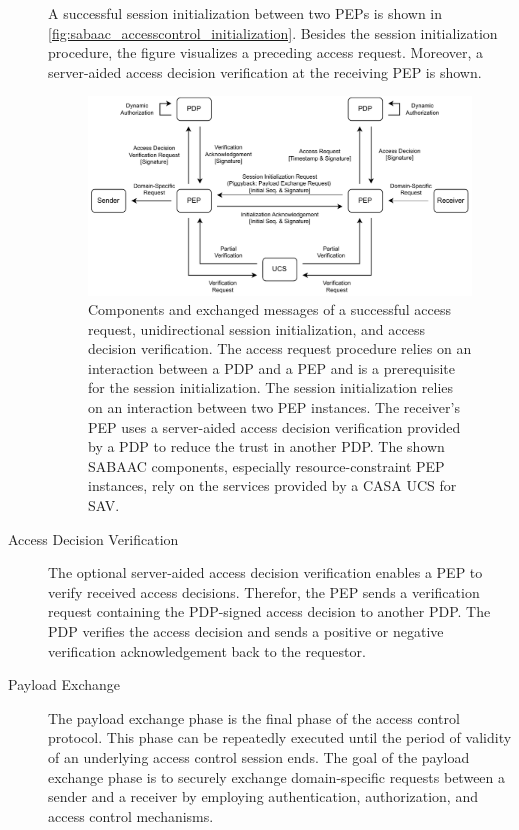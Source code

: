 \begin{description}
    A successful session initialization between two PEPs is shown in \autoref{fig:sabaac_accesscontrol_initialization}.
    Besides the session initialization procedure, the figure visualizes a preceding access request.
    Moreover, a server-aided access decision verification at the receiving PEP is shown.
    \begin{figure}
        \centering
        \includegraphics[width=1.0\linewidth]{figures/SABAAC_protocols_accesscontrol_initialization.drawio.pdf}
        \caption{Components and exchanged messages of a successful access request, unidirectional session initialization, and access decision verification. The access request procedure relies on an interaction between a PDP and a PEP and is a prerequisite for the session initialization. The session initialization relies on an interaction between two PEP instances. The receiver's PEP uses a server-aided access decision verification provided by a PDP to reduce the trust in another PDP. The shown SABAAC components, especially resource-constraint PEP instances, rely on the services provided by a CASA UCS for SAV.}
        \label{fig:sabaac_accesscontrol_initialization}
    \end{figure}
    \item[Access Decision Verification] The optional server-aided access decision verification enables a PEP to verify received access decisions.
    Therefor, the PEP sends a verification request containing the PDP-signed access decision to another PDP.
    The PDP verifies the access decision and sends a positive or negative verification acknowledgement back to the requestor.
    \item[Payload Exchange] The payload exchange phase is the final phase of the access control protocol.
    This phase can be repeatedly executed until the period of validity of an underlying access control session ends.
    The goal of the payload exchange phase is to securely exchange domain-specific requests between a sender and a receiver by employing authentication, authorization, and access control mechanisms.

\end{description}
